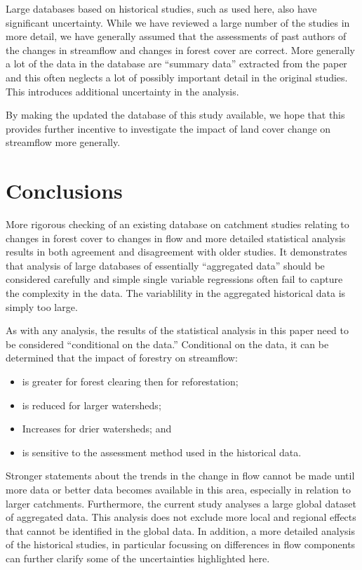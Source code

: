 \documentclass[]{elsarticle} %
\begin{document}
Large databases based on historical studies, such as used here, also have significant uncertainty. While we have reviewed a large number of the studies in more detail, we have generally assumed that the assessments of past authors of the changes in streamflow and changes in forest cover are correct. More generally a lot of the data in the database are ``summary data'' extracted from the paper and this often neglects a lot of possibly important detail in the original studies. This introduces additional uncertainty in the analysis.

By making the updated the database of this study available, we hope that this provides further incentive to investigate the impact of land cover change on streamflow more generally.

\hypertarget{conclusions}{%
\section{Conclusions}\label{conclusions}}

More rigorous checking of an existing database on catchment studies relating to changes in forest cover to changes in flow and more detailed statistical analysis results in both agreement and disagreement with older studies. It demonstrates that analysis of large databases of essentially ``aggregated data'' should be considered carefully and simple single variable regressions often fail to capture the complexity in the data. The variablility in the aggregated historical data is simply too large.

As with any analysis, the results of the statistical analysis in this paper need to be considered ``conditional on the data.''
Conditional on the data, it can be determined that the impact of forestry on streamflow:

\begin{itemize}
\item
  is greater for forest clearing then for reforestation;
\item
  is reduced for larger watersheds;
\item
  Increases for drier watersheds; and
\item
  is sensitive to the assessment method used in the historical data.
\end{itemize}

Stronger statements about the trends in the change in flow cannot be made until more data or better data becomes available in this area, especially in relation to larger catchments. Furthermore, the current study analyses a large global dataset of aggregated data. This analysis does not exclude more local and regional effects that cannot be identified in the global data. In addition, a more detailed analysis of the historical studies, in particular focussing on differences in flow components can further clarify some of the uncertainties highlighted here.
\end{document}

